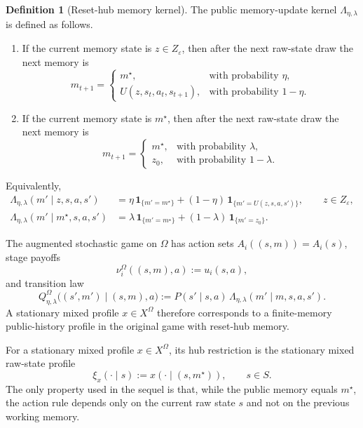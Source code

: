 \documentclass[11pt]{article}
\theoremstyle{definition}
\newtheorem{definition}[theorem]{Definition}
\newcommand{\1}{\mathbf{1}}
\begin{document}
\begin{definition}[Reset-hub memory kernel]\label{def:hub-kernel}
The public memory-update kernel $\Lambda_{\eta,\lambda}$ is defined as follows.
\begin{enumerate}[label=\textup{(\roman*)},leftmargin=2.5em]
\item If the current memory state is $z\in Z_\varepsilon$, then after the next raw-state draw the next memory is
\[
m_{t+1}=
\begin{cases}
m^\star, &\text{with probability }\eta,\\
U(z,s_t,a_t,s_{t+1}), &\text{with probability }1-\eta.
\end{cases}
\]
\item If the current memory state is $m^\star$, then after the next raw-state draw the next memory is
\[
m_{t+1}=
\begin{cases}
m^\star, &\text{with probability }\lambda,\\
z_0, &\text{with probability }1-\lambda.
\end{cases}
\]
\end{enumerate}
Equivalently,
\begin{align*}
\Lambda_{\eta,\lambda}(m'\mid z,s,a,s')
&=
\eta\,\1_{\{m'=m^\star\}}+(1-\eta)\,\1_{\{m'=U(z,s,a,s')\}},
\qquad z\in Z_\varepsilon,
\\
\Lambda_{\eta,\lambda}(m'\mid m^\star,s,a,s')
&=
\lambda\,\1_{\{m'=m^\star\}}+(1-\lambda)\,\1_{\{m'=z_0\}}.
\end{align*}
\end{definition}

The augmented stochastic game on $\Omega$ has action sets $A_i((s,m))=A_i(s)$, stage payoffs
\[
\nu_i^\Omega((s,m),a):=u_i(s,a),
\]
and transition law
\begin{equation}\label{eq:hub-aug-transition}
Q^{\Omega}_{\eta,\lambda}\bigl((s',m')\mid (s,m),a\bigr)
:=P(s'\mid s,a)\,\Lambda_{\eta,\lambda}(m'\mid m,s,a,s').
\end{equation}
A stationary mixed profile $x\in X^\Omega$ therefore corresponds to a finite-memory public-history profile in the original game with reset-hub memory.

For a stationary mixed profile $x\in X^\Omega$, its hub restriction is the stationary mixed raw-state profile
\[
\xi_x(\cdot\mid s):=x(\cdot\mid (s,m^\star)),
\qquad s\in S.
\]
The only property used in the sequel is that, while the public memory equals $m^\star$, the action rule depends only on the current raw state $s$ and not on the previous working memory.
\end{document}
